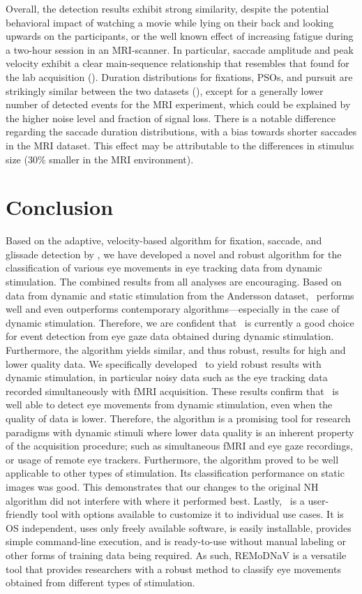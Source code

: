 Overall, the detection results exhibit strong similarity, despite the potential
behavioral impact of watching a movie while lying on their back and looking
upwards on the participants, or the well known effect of increasing fatigue
during a two-hour session in an MRI-scanner. In particular, saccade amplitude
and peak velocity exhibit a clear main-sequence relationship that resembles
that found for the lab acquisition (). Duration distributions
for fixations, PSOs, and pursuit are strikingly similar between the two
datasets (), except for a generally lower number of detected events
for the MRI experiment, which could be explained by the higher noise level and
fraction of signal loss. There is a notable difference regarding the saccade
duration distributions, with a bias towards shorter saccades in the MRI
dataset. This effect may be attributable to the differences in stimulus size
(30\% smaller in the MRI environment).


\section*{Conclusion}\label{con}


Based on the adaptive, velocity-based algorithm for fixation, saccade, and
glissade detection by \cite{Nystrom2010AnData}, we have developed a novel and
robust algorithm for the classification of various eye movements in eye
tracking data from dynamic stimulation.  The combined results from all analyses
are encouraging. Based on data from dynamic and static stimulation from the
Andersson dataset, \remodnav\ performs well and even outperforms contemporary
algorithms---especially in the case of dynamic stimulation. Therefore, we
are confident that \remodnav\ is currently a good choice for event detection
from eye gaze data obtained during dynamic stimulation.  Furthermore, the
algorithm yields similar, and thus robust, results for high and lower quality
data. We specifically developed \remodnav\ to yield robust results with dynamic
stimulation, in particular noisy data such as the eye tracking data recorded
simultaneously with fMRI acquisition. These results confirm that \remodnav\ is
well able to detect eye movements from dynamic stimulation, even when the
quality of data is lower. Therefore, the algorithm is a promising tool for
research paradigms with dynamic stimuli where lower data quality is an inherent
property of the acquisition procedure; such as simultaneous fMRI and eye gaze
recordings, or usage of remote eye trackers.  Furthermore, the algorithm proved
to be well applicable to other types of stimulation. Its classification
performance on static images was good. This demonstrates that our changes to
the original NH algorithm did not interfere with where it performed best. 
Lastly, \remodnav\ is a user-friendly tool with options available to customize
it to individual use cases. It is OS independent, uses only freely available
software, is easily installable, provides simple command-line execution, and is
ready-to-use without manual labeling or other forms of training data being
required. As such, REMoDNaV is a versatile tool that provides researchers with
a robust method to classify eye movements obtained from different types of
stimulation.


